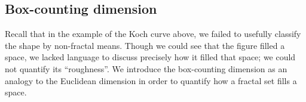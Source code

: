 


\subsection{Box-counting dimension}
Recall that in the example of the Koch curve above, we failed to usefully classify the shape by non-fractal means. Though we could see that the figure filled a space, we lacked language to discuss precisely how it filled that space; we could not quantify its ``roughness''. We introduce the box-counting dimension as an analogy to the Euclidean dimension in order to quantify how a fractal set fills a space.

